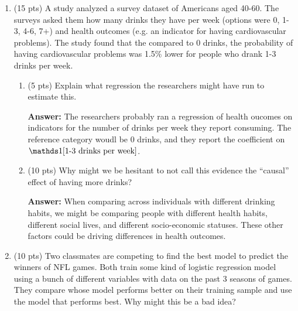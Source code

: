 \documentclass[12pt]{article}
\newcommand{\answer}[1]{{\color{blue_winged_teal}\textbf{Answer:} #1}}
\newcommand{\pts}[1]{{\color{zinc500}(#1 pts)}}
\begin{document}
\begin{enumerate}
\begin{enumerate}
    \item \pts{10} Say you want to let the relationship between height and points scored vary by position. Describe the regression you could run that would estimate different slopes by position, i.e. what terms would you include in your model?
    
    \answer{
      We could run a regression with the following terms:
      \begin{enumerate}
        \item Height
        \item Position indicators
        \item Height interacted with position indicators
      \end{enumerate}
      This would allow us to estimate different slopes for each position.
    }
  \end{enumerate}
    
  \bigskip
  \item \pts{15} A study analyzed a survey dataset of Americans aged 40-60. The surveys asked them how many drinks they have per week (options were 0, 1-3, 4-6, 7+) and health outcomes (e.g. an indicator for having cardiovascular problems).
  The study found that the compared to 0 drinks, the probability of having cardiovascular problems was 1.5\% lower for people who drank 1-3 drinks per week.
  \begin{enumerate}
    \item \pts{5} Explain what regression the researchers might have run to estimate this.
    
    \answer{
      The researchers probably ran a regression of health oucomes on indicators for the number of drinks per week they report consuming. 
      The reference category woudl be 0 drinks, and they report the coefficient on $\one{\text{1-3 drinks per week}}$.
    }


    \item \pts{10} Why might we be hesitant to not call this evidence the ``causal'' effect of having more drinks?
    
    \answer{
      When comparing across individuals with different drinking habits, we might be comparing people with different health habits, different social lives, and different socio-economic statuses. 
      These other factors could be driving differences in health outcomes.
    }
  \end{enumerate}

  
  \bigskip
  \item \pts{10} Two classmates are competing to find the best model to predict the winners of NFL games. Both train some kind of logistic regression model using a bunch of different variables with data on the past 3 seasons of games. They compare whose model performs better on their training sample and use the model that performs best. Why might this be a bad idea?
  

\end{enumerate}
\end{document}
